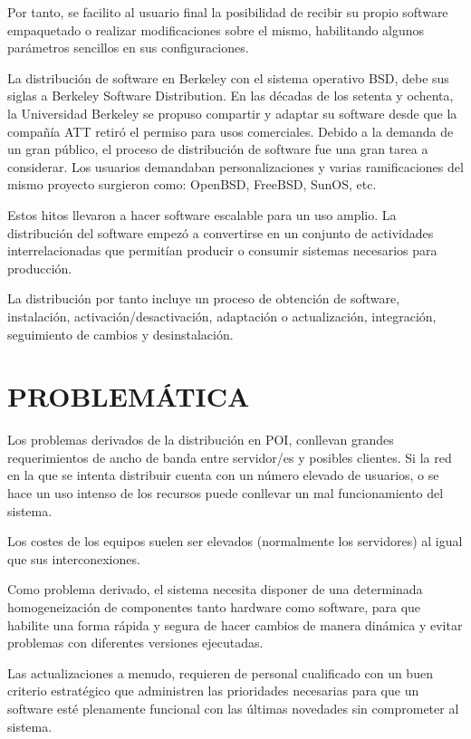 Por tanto, se facilito al usuario final la posibilidad de recibir su propio
software empaquetado o realizar modificaciones sobre el mismo, habilitando
algunos parámetros sencillos en sus configuraciones.

La distribución de software en Berkeley con el sistema operativo BSD,
debe sus siglas a Berkeley Software Distribution. En las décadas de los setenta
y ochenta, la Universidad Berkeley se propuso compartir y
adaptar su software desde que la compañía ATT
retiró el permiso para usos comerciales. Debido a la demanda de un
gran público, el proceso de distribución de software fue una gran tarea a
considerar. Los usuarios demandaban personalizaciones y varias ramificaciones
del mismo proyecto surgieron como: OpenBSD, FreeBSD, SunOS, etc.
    
Estos hitos llevaron a hacer software escalable para un uso amplio. La
distribución del software empezó a convertirse en un conjunto de actividades
interrelacionadas que permitían producir o consumir sistemas necesarios para
producción.

La distribución por tanto incluye un proceso de obtención de software,
instalación, activación/desactivación, adaptación o actualización, integración,
seguimiento de cambios y desinstalación.

\section{\uppercase{Problemática}}

Los problemas derivados de la distribución en POI, conllevan grandes
requerimientos de ancho de banda entre servidor/es y posibles
clientes\cite{New10}. Si la red en la que se intenta distribuir cuenta con un
número elevado de usuarios, o se hace un uso intenso de los recursos puede
conllevar un mal funcionamiento del sistema\cite{Hel00}.

Los costes de los equipos suelen ser elevados (normalmente los
servidores) al igual que sus interconexiones.

Como problema derivado, el sistema necesita disponer de una determinada
homogeneización de componentes tanto hardware como software, para que habilite
una forma rápida y segura de hacer cambios de manera dinámica y evitar problemas
con diferentes versiones ejecutadas.

Las actualizaciones a menudo, requieren de personal cualificado con un buen
criterio estratégico que administren las prioridades necesarias para
que un software esté plenamente funcional con las últimas novedades sin
comprometer al sistema.

